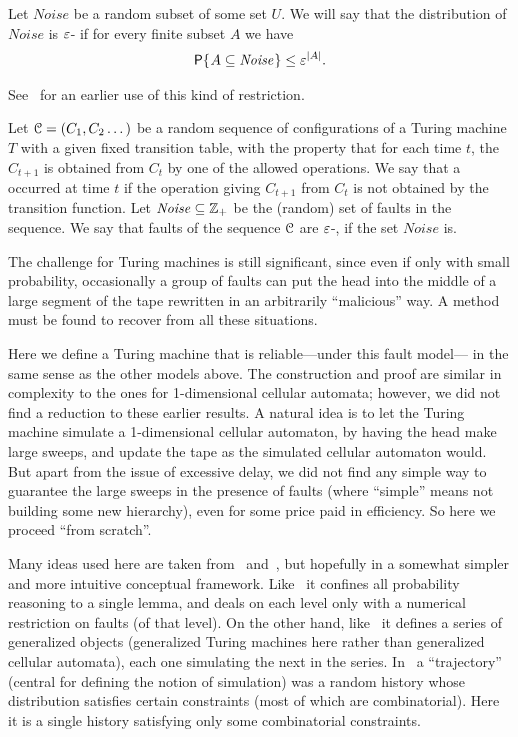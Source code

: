 \documentclass[11pt]{memoir}
\theoremstyle{definition} %
\renewcommand{\le}{\leq}
\newcommand{\Noise}{\mathit{Noise}}
\begin{document}
\begin{definition}
  Let \( \Noise \) be a random subset of some set \( U \).
  We will say that the distribution of \( \Noise \) is \( \varepsilon \)- if for every finite subset \( A \)
  we have
  \begin{align*}
   \Pbof{A\subseteq\Noise} \le \eps^{|A|}.
  \end{align*}
\end{definition}
See~\cite{Toom80} for an earlier use of this kind of restriction.

\begin{definition}\label{def:faults-eps-bounded}
  Let \( \mathcal{C} = (C_{1},C_{2}\dots) \) be  a random sequence of configurations of a Turing machine \( T \)
  with a given fixed
  transition table, with the property that for each time \( t \), the \( C_{t+1} \) is obtained from \( C_{t} \) by
  one of the allowed operations.
  We say that a  occurred at time \( t \) if the operation giving \( C_{t+1} \) from \( C_{t} \) is
  not obtained by the transition function.
  Let \( \Noise\subseteq\bbZ_{+} \) be the (random) set of faults in the sequence.
  We say that faults of the sequence \( \mathcal{C} \) are \( \varepsilon \)-, if the set \( \Noise \) is.  
\end{definition}

The challenge for Turing machines
is still significant, since even if only with small probability, occasionally a group
of faults can put the head into the middle of a large segment of the tape rewritten
in an arbitrarily ``malicious'' way.
A method must be found to recover from all these situations.

Here we define a Turing machine that is reliable---under this fault model--- in
the same sense as the other models above.
The construction and proof are similar in complexity to the ones for 1-di\-men\-sion\-al cellular automata;
however, we did not find a reduction to these earlier results.
A natural idea is to let the Turing machine simulate a 1-dimensional cellular automaton, by
having the head make large sweeps, and update the tape as the simulated cellular automaton would.
But apart from the issue of excessive delay, we did not find any simple
way to guarantee the large sweeps in the presence of faults (where ``simple'' means not building some new
hierarchy), even for some price paid in efficiency.
So here we proceed ``from scratch''.

Many ideas used here are taken from~\cite{Gacs1dim86} and~\cite{GacsSorg01},
but hopefully in a somewhat simpler and more intuitive conceptual framework.
Like~\cite{Gacs1dim86} it confines all probability reasoning to a single lemma,
and deals on each level only with a numerical restriction on faults (of that level).
On the other hand, like~\cite{GacsSorg01} it defines a series of generalized objects
(generalized Turing machines here rather than generalized cellular automata),
each one simulating the next in the series.
In~\cite{GacsSorg01} a ``trajectory'' (central for defining the notion of simulation) was
a random history whose distribution satisfies certain constraints (most of which are combinatorial).
Here it is a single history satisfying only some combinatorial constraints.
\end{document}
